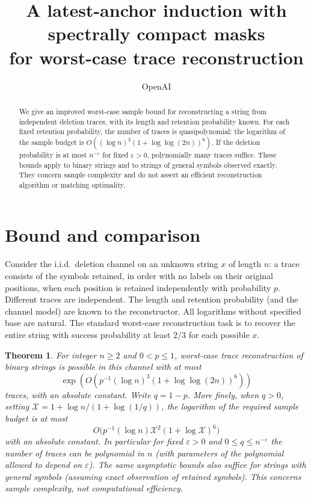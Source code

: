 \documentclass[11pt]{article}
\title{A latest-anchor induction with spectrally compact masks\\for worst-case trace reconstruction}
\author{OpenAI}
\date{}
\newtheorem{thm}{Theorem}
\begin{document}
\maketitle

\begin{abstract}
We give an improved worst-case sample bound for reconstructing a string
from independent deletion traces, with its length and retention
probability known. For each fixed retention probability, the number of
traces is quasipolynomial: the logarithm of the sample budget is
$O((\log n)^3(1+\log\log(2n))^6)$. If the deletion probability is at most
$n^{-\varepsilon}$ for fixed $\varepsilon>0$, polynomially many traces
suffice. These bounds apply to binary strings and to strings of general
symbols observed exactly. They concern sample complexity and do not
assert an efficient reconstruction algorithm or matching optimality.
\end{abstract}

\section*{Bound and comparison}
Consider the i.i.d.\ deletion channel on an unknown string $x$ of length $n$:
a trace consists of the symbols retained, in order with no labels on their
original positions, when each position is retained independently with
probability $p$. Different traces are independent. The length and retention
probability (and the channel model) are known to the reconstructor. All logarithms without
specified base are natural. The standard worst-case reconstruction task is to
recover the entire string with success probability at least $2/3$ for
each possible $x$.
\begin{thm}
For integer $n\ge 2$ and $0<p\le1$, worst-case trace reconstruction of
binary strings is possible in this channel with at most
\[
\exp\!\left(O\!\left(p^{-1}(\log n)^3(1+\log\log(2n))^6\right)\right)
\]
traces, with an absolute constant. Write $q=1-p$. More finely, when $q>0$, setting
$\mathcal X=1+\log n/(1+\log(1/q))$, the logarithm of the required sample
budget is at most
\[
 O\big(p^{-1}(\log n)\mathcal X^2 (1+\log\mathcal X)^6\big)
\]
with an absolute constant. In particular for fixed $\varepsilon>0$ and
$0\le q\le n^{-\varepsilon}$ the number of traces can be polynomial in $n$
(with parameters of the polynomial allowed to depend on $\varepsilon$).
The same asymptotic bounds also suffice for
strings with general symbols (assuming exact observation of retained symbols).
This concerns sample complexity, not computational efficiency.
\end{thm}
\end{document}
